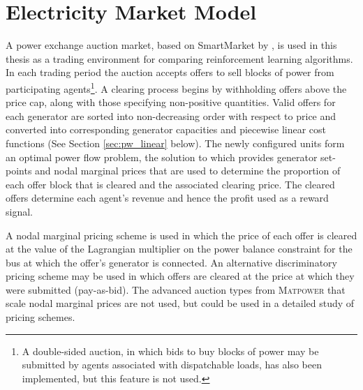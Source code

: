 \section{Electricity Market Model}
A power exchange auction market, based on SmartMarket by
, is used in this thesis as a trading
environment for comparing reinforcement learning algorithms.  In each trading
period the auction accepts offers to sell blocks of power from participating
agents\footnote{A double-sided auction, in which bids to buy blocks of power may
be submitted by agents associated with dispatchable loads, has also been
implemented, but this feature is not used.}.
A clearing process begins by withholding offers above the price cap, along with
those specifying non-positive quantities.  Valid offers for each generator are
sorted into non-decreasing order with respect to price and converted into
corresponding generator capacities and piecewise linear cost functions (See
Section \ref{sec:pw_linear} below).  The newly configured units form an optimal
power flow problem, the solution to which provides generator set-points and
nodal marginal prices that are used to determine the proportion of each offer
block that is cleared and the associated clearing price.  The cleared offers
determine each agent's revenue and hence the profit used as a reward
signal.


A nodal marginal pricing scheme is used in which the price of each offer is
cleared at the value of the Lagrangian multiplier on the power balance
constraint for the bus at which the offer's generator is connected. An
alternative discriminatory pricing scheme may be used in which offers are
cleared at the price at which they were submitted (pay-as-bid).  The advanced
auction types from \textsc{Matpower} that scale nodal marginal prices are not
used, but could be used in a detailed study of pricing schemes.


